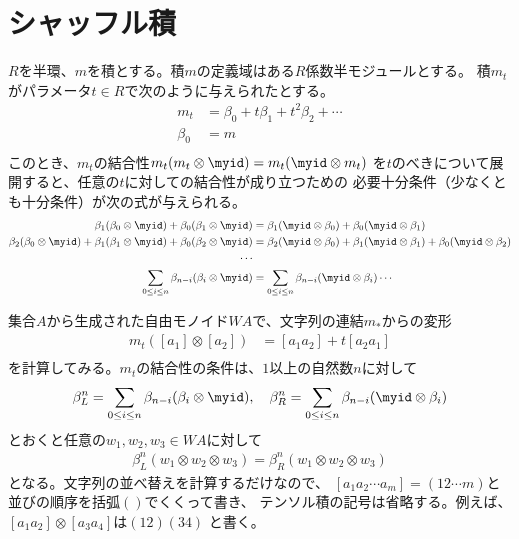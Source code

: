 \section{シャッフル積}\label{s1:シャッフル積} %
	$R$を半環、$m$を積とする。積$m$の定義域はある$R$係数半モジュールとする。
	積$m_t$がパラメータ$t\in R$で次のように与えられたとする。
	\begin{equation*}\begin{split} %
		m_t &= \beta_0 + t\beta_1 + t^2\beta_2 + \cdots \\
		\beta_0 &= m \\
	\end{split}\end{equation*} %
	このとき、$m_t$の結合性$m_t(m_t\otimes \myid)=m_t(\myid\otimes m_t)$
	を$t$のべきについて展開すると、任意の$t$に対しての結合性が成り立つための
	必要十分条件（少なくとも十分条件）が次の式が与えられる。
	\begin{equation*}\begin{split} %
		\beta_1(\beta_0\otimes \myid) + \beta_0(\beta_1\otimes \myid)
		&= \beta_1(\myid\otimes \beta_0) + \beta_0(\myid\otimes \beta_1)
		\\
		\beta_2(\beta_0\otimes \myid) + \beta_1(\beta_1\otimes \myid)
		+ \beta_0(\beta_2\otimes \myid)
		&= \beta_2(\myid\otimes \beta_0) + \beta_1(\myid\otimes \beta_1)
		+ \beta_0(\myid\otimes \beta_2)
		\\
		\cdots \\
		\sum_{0\le i\le n}\beta_{n-i}(\beta_i\otimes \myid)
		&= \sum_{0\le i\le n}\beta_{n-i}(\myid\otimes \beta_i)
		\cdots \\
	\end{split}\end{equation*} %

	集合$A$から生成された自由モノイド$WA$で、文字列の連結$m_*$からの変形
	\begin{equation}\label{eq:積の変形その一}\begin{split} %
		m_t([a_1]\otimes[a_2]) &= [a_1a_2] + t[a_2a_1] \\
	\end{split}\end{equation} %
	を計算してみる。$m_t$の結合性の条件は、$1$以上の自然数$n$に対して
	\begin{equation*}\begin{split} %
		\beta_L^n = \sum_{0\le i\le n}\beta_{n-i}(\beta_i\otimes \myid)
		,\quad
		\beta_R^n = \sum_{0\le i\le n}\beta_{n-i}(\myid\otimes \beta_i)
	\end{split}\end{equation*} %
	とおくと任意の$w_1,w_2,w_3\in WA$に対して
	\begin{equation*}\begin{split} %
		\beta_L^n(w_1\otimes w_2\otimes w_3)
		=\beta_R^n(w_1\otimes w_2\otimes w_3)
	\end{split}\end{equation*} %
	となる。文字列の並べ替えを計算するだけなので、
	$[a_1a_2\cdots a_m]=(12\cdots m)$と並びの順序を括弧$()$でくくって書き、
	テンソル積の記号は省略する。例えば、$[a_1a_2]\otimes[a_3a_4]$は$(12)(34)$
	と書く。

